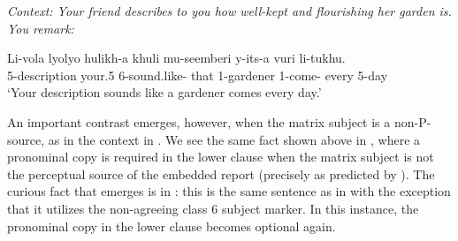 \documentclass[output=paper,colorlinks,citecolor=brown
]{langscibook}
\begin{document}
 

\ea \label{ex:johnson:HearAboutGardenNonAgr6} \textit{Context: Your friend describes to you how well-kept and flourishing her garden is. You remark:} %



\gll Li-vola lyolyo hulikh-a khuli mu-seemberi y-its-a vuri li-tukhu.\\
5-description your.5 6\Sm-sound.like-\Fv{} that 1-gardener 1\Sm-come-\Fv{} every 5-day \\
\glt `Your description sounds like a gardener comes every day.'


\z

An important contrast emerges, however, when the matrix subject is a non-P-source, as in the context in . We see the same fact shown above in , where a pronominal copy is required in the lower clause when the matrix subject is not the perceptual source of the embedded report (precisely as predicted by \citealt{Landau:2011:CopyRaising}). The curious fact that emerges is in : this is the same sentence as in  with the exception that it utilizes the non-agreeing class 6 subject marker. In this instance, the pronominal copy in the lower clause becomes optional again. 
\end{document}
